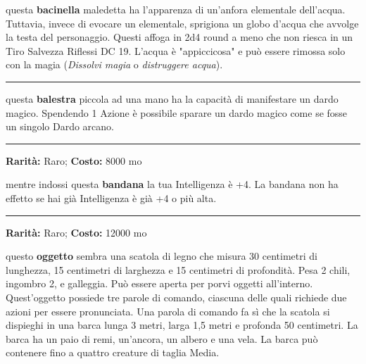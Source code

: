 \begin{multicols}{2}
questa \textbf{bacinella} maledetta ha l'apparenza di un'anfora elementale dell'acqua. Tuttavia, invece di evocare un elementale, sprigiona un globo d'acqua che avvolge la testa del personaggio. Questi affoga in 2d4 round a meno che non riesca in un Tiro Salvezza Riflessi DC 19. L'acqua è "appiccicosa" e può essere rimossa solo con la magia (\emph{Dissolvi magia} o \emph{distruggere acqua}).

\smallskip\noindent\rule{\linewidth}{2pt}  \hypertarget{BalestradeiDardiArcani}{}\smallskip{}\noindent\label{BalestradeiDardiArcani}

questa \textbf{balestra} piccola ad una mano ha la capacità di manifestare un dardo magico.
Spendendo 1 Azione è possibile sparare un dardo magico come se fosse un singolo Dardo arcano.

\smallskip\noindent\rule{\linewidth}{2pt}  \hypertarget{Bandanadell'Intelligenza}{}\smallskip{}\noindent\label{Bandanadell'Intelligenza}

\textbf{Rarità:} Raro; \textbf{Costo:} 8000 mo

mentre indossi questa \textbf{bandana} la tua Intelligenza è +4. La bandana non ha effetto se hai già Intelligenza è già +4 o più alta.

\smallskip\noindent\rule{\linewidth}{2pt}  \hypertarget{BarcaPieghevole}{}\smallskip{}\noindent\label{BarcaPieghevole}

\textbf{Rarità:} Raro; \textbf{Costo:} 12000 mo

questo \textbf{oggetto} sembra una scatola di legno che misura 30 centimetri di lunghezza, 15 centimetri di larghezza e 15 centimetri di profondità. Pesa 2 chili, ingombro 2, e galleggia. Può essere aperta per porvi oggetti all'interno. Quest'oggetto possiede tre parole di comando, ciascuna delle quali richiede due azioni per essere pronunciata. Una parola di comando fa sì che la scatola si dispieghi in una barca lunga 3 metri, larga 1,5 metri e profonda 50 centimetri. La barca ha un paio di remi, un'ancora, un albero e una vela. La barca può contenere fino a quattro creature di taglia Media.


\end{multicols}
